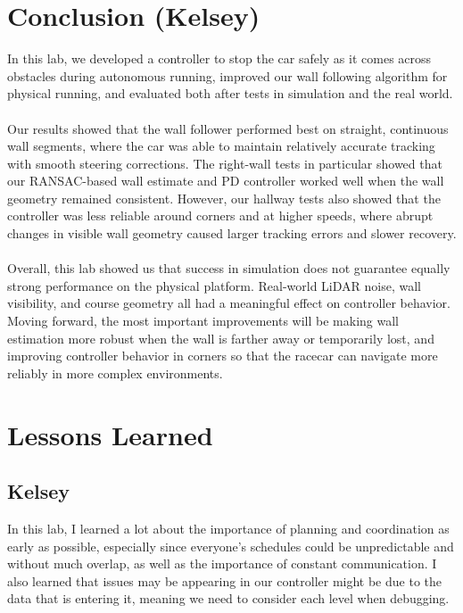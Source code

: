 \documentclass{article}
\begin{document}
\section{Conclusion (Kelsey)}
In this lab, we developed a controller to stop the car safely as it comes across obstacles during autonomous running, improved our wall following algorithm for physical running, and evaluated both after tests in simulation and the real world. \\\\
Our results showed that the wall follower performed best on straight, continuous wall segments, where the car was able to maintain relatively accurate tracking with smooth steering corrections. The right-wall tests in particular showed that our RANSAC-based wall estimate and PD controller worked well when the wall geometry remained consistent. However, our hallway tests also showed that the controller was less reliable around corners and at higher speeds, where abrupt changes in visible wall geometry caused larger tracking errors and slower recovery. \\\\
Overall, this lab showed us that success in simulation does not guarantee equally strong performance on the physical platform. Real-world LiDAR noise, wall visibility, and course geometry all had a meaningful effect on controller behavior. Moving forward, the most important improvements will be making wall estimation more robust when the wall is farther away or temporarily lost, and improving controller behavior in corners so that the racecar can navigate more reliably in more complex environments.


\section{Lessons Learned}
\subsection{Kelsey}
In this lab, I learned a lot about the importance of planning and coordination as early as possible, especially since everyone's schedules could be unpredictable and without much overlap, as well as the importance of constant communication. I also learned that issues may be appearing in our controller might be due to the data that is entering it, meaning we need to consider each level when debugging.
\end{document}
